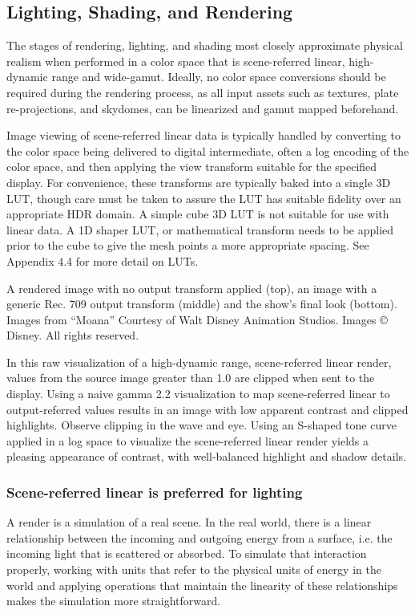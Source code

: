 \subsection{Lighting, Shading, and Rendering}

The stages of rendering, lighting, and shading most closely approximate physical realism when performed in a color space that is scene-referred linear, high-dynamic range and wide-gamut. Ideally, no color space conversions should be required during the rendering process, as all input assets such as textures, plate re-projections, and skydomes, can be linearized and gamut mapped beforehand. 

Image viewing of scene-referred linear data is typically handled by converting to the color space being delivered to digital intermediate, often a log encoding of the color space, and then applying the view transform suitable for the specified display. For convenience, these transforms are typically baked into a single 3D LUT, though care must be taken to assure the LUT has suitable fidelity over an appropriate HDR domain. A simple cube 3D LUT is not suitable for use with linear data. A 1D shaper LUT, or mathematical transform needs to be applied prior to the cube to give the mesh points a more appropriate spacing. See Appendix 4.4 for more detail on LUTs.



A rendered image with no output transform applied (top), an image with a generic Rec. 709 output transform (middle) and the show’s final look (bottom).
Images from “Moana” Courtesy of Walt Disney Animation Studios. Images © Disney. All rights reserved.

In this raw visualization of a high-dynamic range, scene-referred linear render, values from the source image greater than 1.0 are clipped when sent to the display. Using a naive gamma 2.2 visualization to map scene-referred linear to output-referred values results in an image with low apparent contrast and clipped highlights. Observe clipping in the wave and eye. Using an S-shaped tone curve applied in a log space to visualize the scene-referred linear render yields a pleasing appearance of contrast, with well-balanced highlight and shadow details.

\subsubsection{Scene-referred linear is preferred for lighting}

A render is a simulation of a real scene. In the real world, there is a linear relationship between the incoming and outgoing energy from a surface, i.e. the incoming light that is scattered or absorbed. To simulate that interaction properly, working with units that refer to the physical units of energy in the world and applying operations that maintain the linearity of these relationships makes the simulation more straightforward. 

